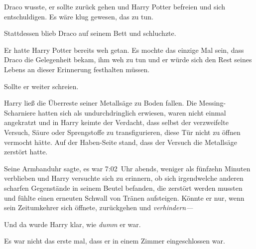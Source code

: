 Draco wusste, er sollte zurück gehen und Harry Potter befreien und sich entschuldigen. Es wäre klug gewesen, das zu tun.

Stattdessen blieb Draco auf seinem Bett und schluchzte.

Er hatte Harry Potter bereits weh getan. Es mochte das einzige Mal sein, dass Draco die Gelegenheit bekam, ihm weh zu tun und er würde sich den Rest seines Lebens an dieser Erinnerung festhalten müssen.

Sollte er weiter schreien.

\later

Harry ließ die Überreste seiner Metallsäge zu Boden fallen. Die Messing-Scharniere hatten sich als undurchdringlich erwiesen, waren nicht einmal angekratzt und in Harry keimte der Verdacht, dass selbst der verzweifelte Versuch, Säure oder Sprengstoffe zu transfigurieren, diese Tür nicht zu öffnen vermocht hätte. Auf der Haben-Seite stand, dass der Versuch die Metallsäge zerstört hatte.

Seine Armbanduhr sagte, es war 7:02~Uhr abends, weniger als fünfzehn Minuten verblieben und Harry versuchte sich zu erinnern, ob sich irgendwelche anderen scharfen Gegenstände in seinem Beutel befanden, die zerstört werden mussten und fühlte einen erneuten Schwall von Tränen aufsteigen. Könnte er nur, wenn sein Zeitumkehrer sich öffnete, zurückgehen und \emph{verhindern—}

Und da wurde Harry klar, wie \emph{dumm} er war.

Es war nicht das erste mal, dass er in einem Zimmer eingeschlossen war.

